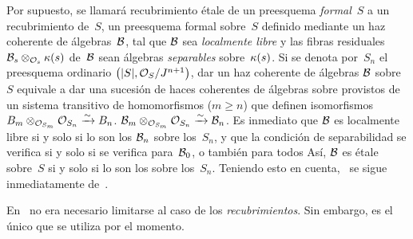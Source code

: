 Por supuesto, se llamará recubrimiento étale de un preesquema \emph{formal}~$S$ a un recubrimiento de~$S$, \ie un preesquema formal sobre~$S$ definido mediante un haz coherente de álgebras~$\cal{B}$, tal que $\cal{B}$ sea \emph{localmente libre} y las fibras residuales $\cal{B}_s\otimes_{\cal{O}_s}\kres(s)$ de~$\cal{B}$ sean álgebras \emph{separables} sobre~$\kres(s)$. Si se denota por~$S_n$ el preesquema ordinario
{$\bigl(|S|,\cal{O}_S/J^{n+1}\bigr)$,}%
dar un haz coherente de álgebras $\cal{B}$ sobre~$S$ equivale a dar una sucesión de haces coherentes de álgebras
sobre
provistos de un sistema transitivo de homomorfismos
($m\geq n$) que definen isomorfismos
{$B_m\otimes_{\cal{O}_{S_m}}\cal{O}_{S_n}\isomto B_n$.}
{$\cal{B}_m\otimes_{\cal{O}_{S_m}}\cal{O}_{S_n}\isomto\cal{B}_n$.}
Es inmediato que $\cal{B}$ es localmente libre si y solo si lo son los $\cal{B}_n$ sobre los~$S_n$, y que la condición de separabilidad se verifica si y solo si se verifica para~$\cal{B}_0$, o también para todos
Así, $\cal{B}$ es étale sobre~$S$ si y solo si lo son los
sobre los~$S_n$. Teniendo esto en cuenta,~ se sigue inmediatamente de~.

\begin{remarquestar}
En~ no era necesario limitarse al caso de los \emph{recubrimientos}. Sin embargo, es el único que se utiliza por el momento.
\end{remarquestar}
